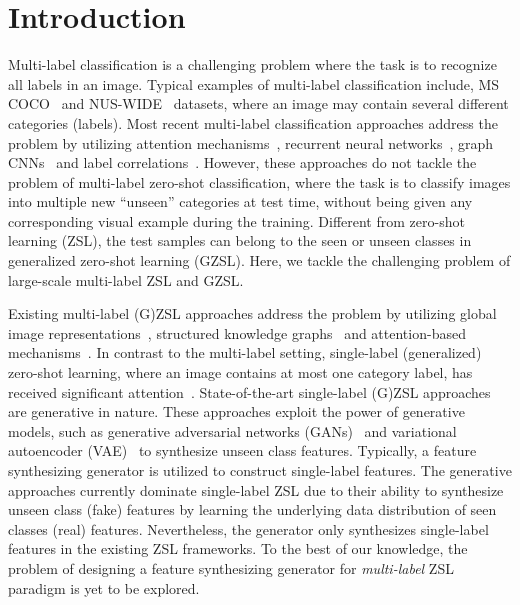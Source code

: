 \documentclass[final]{cvpr}
\begin{document}
\section{Introduction}

Multi-label classification is a challenging problem where the task is to recognize all labels in an image.
Typical examples of multi-label classification include, MS COCO~\cite{coco} and NUS-WIDE~\cite{nuswide} datasets, where an image may contain several different categories (labels). Most recent multi-label classification approaches address the problem by utilizing attention mechanisms~\cite{wang2017multi,yeattention,you2020cross}, recurrent neural networks~\cite{wang2016cnn,yazici2020orderless,nam2017maximizing}, graph CNNs~\cite{kipf2016semi,chen2019multi} and label correlations~\cite{weston2011wsabie,durand2019learning}. However, these approaches do not tackle the problem of multi-label zero-shot classification, where the task is to classify images into multiple new ``unseen'' categories at test time, without being given any corresponding visual example during the training. 
Different from zero-shot learning (ZSL), the test samples can belong to the seen or unseen classes in generalized zero-shot learning (GZSL). Here, we tackle the challenging problem of large-scale multi-label ZSL and GZSL. 

Existing multi-label (G)ZSL approaches address the problem by utilizing global image representations~\cite{mensink2014costa,zhang2016fast}, structured knowledge graphs~\cite{lee2018multi} and attention-based mechanisms~\cite{huynh2020shared}. In contrast to the multi-label setting, single-label (generalized) zero-shot learning, where an image contains at most one category label, has received significant attention~\cite{jayaraman14nips,fu15pami,frome13nips,romera15icml,rohrbach13nips,Ye17cvpr,akata2015label,zsl-good-bad-ugly,xian2018feature,xian2019f}. State-of-the-art single-label (G)ZSL approaches~\cite{xian2018feature,Rafael18eccv,li19leveraging,huang19generative,Mandal19cvpr,xian2019f,narayan2020latent} are generative in nature. These approaches exploit the power of generative models, such as generative adversarial networks (GANs)~\cite{gan} and variational autoencoder (VAE)~\cite{kingma13iclr} to synthesize unseen class features. Typically, a feature synthesizing generator is utilized to construct single-label features. The generative approaches currently dominate single-label ZSL due to their ability to synthesize unseen class (fake) features by learning the underlying data distribution of seen classes (real) features. Nevertheless, the generator only synthesizes single-label features in the existing ZSL frameworks. To the best of our knowledge, the problem of designing a feature synthesizing generator for \textit{multi-label} ZSL paradigm is yet to be explored.
\end{document}
